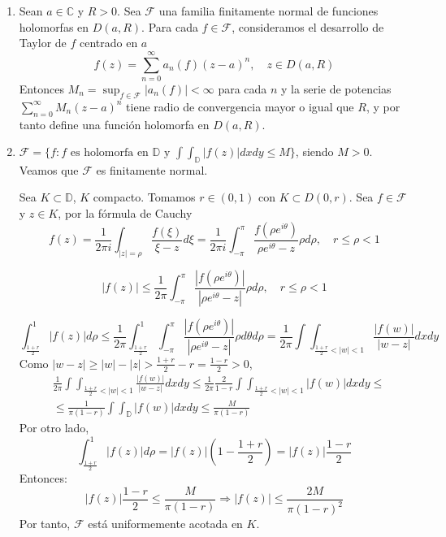 \begin{example}
\begin{enumerate}
        \item Sean $a \in \mathbb{C}$ y $R > 0$.
              Sea $\mathcal{F}$ una familia finitamente normal de funciones holomorfas en $D(a, R)$.
              Para cada $f \in \mathcal{F}$, consideramos el desarrollo de Taylor de $f$ centrado en $a$
              $$f(z) = \sum_{n=0}^\infty a_n(f)(z-a)^n, \quad z \in D(a, R)$$
              Entonces $M_n = \sup_{f \in \mathcal{F}} |a_n(f)| < \infty$ para cada $n$ y la serie de potencias $\sum_{n=0}^\infty M_n(z-a)^n$ tiene radio de convergencia mayor o igual que $R$, y por tanto define una función holomorfa en $D(a, R)$.


        \item $\mathcal{F} = \{f : f \text{ es holomorfa en } \mathbb{D} \text{ y } \int\int_\mathbb{D} |f(z)|dxdy \leq M\}$, siendo $M > 0$.
              Veamos que $\mathcal{F}$ es finitamente normal.

              Sea $K \subset \mathbb{D}$, $K$ compacto.
              Tomamos $r \in (0, 1)$ con $K \subset D(0, r)$.
              Sea $f \in \mathcal{F}$ y $z \in K$, por la fórmula de Cauchy
              $$f(z) = \frac{1}{2\pi i} \int_{|z| = \rho} \frac{f(\xi)}{\xi-z}d\xi = \frac{1}{2\pi i} \int_{-\pi}^\pi \frac{f(\rho e^{i\theta})}{\rho e^{i\theta} - z}\rho d\rho, \quad r \leq \rho < 1$$

              $$|f(z)| \leq \frac{1}{2\pi} \int_{-\pi}^\pi \frac{|f(\rho e^{i\theta})|}{|\rho e^{i\theta} - z|}\rho d\rho, \quad r \leq \rho < 1$$

              $$\int_{\frac{1+r}{2}}^1 |f(z)|d\rho \leq \frac{1}{2\pi} \int_{\frac{1+r}{2}}^1 \int_{-\pi}^\pi \frac{|f(\rho e^{i\theta})|}{|\rho e^{i\theta} - z|}\rho d\theta d\rho = \frac{1}{2\pi} \int\int_{\frac{1+r}{2} < |w| < 1} \frac{|f(w)|}{|w-z|}dxdy$$
              Como $|w-z| \geq |w| - |z| > \frac{1+r}{2}-r = \frac{1-r}{2} > 0$,
              \begin{align*}
                   & \frac{1}{2\pi} \int\int_{\frac{1+r}{2} < |w| < 1} \frac{|f(w)|}{|w-z|}dxdy \leq \frac{1}{2\pi} \frac{2}{1-r} \int\int_{\frac{1+r}{2} < |w| < 1} |f(w)| dxdy \leq \\
                   & \leq \frac{1}{\pi(1-r)} \int\int_\mathbb{D} |f(w)|dxdy \leq \frac{M}{\pi(1-r)}
              \end{align*}
              Por otro lado,
              $$\int_{\frac{1+r}{2}}^1 |f(z)|d\rho = |f(z)|\left(1 - \frac{1+r}{2}\right) = |f(z)|\frac{1-r}{2}$$
              Entonces:
              $$|f(z)|\frac{1-r}{2} \leq \frac{M}{\pi(1-r)} \Rightarrow |f(z)| \leq \frac{2M}{\pi(1-r)^2}$$
              Por tanto, $\mathcal{F}$ está uniformemente acotada en $K$.
    \end{enumerate}
\end{example}

